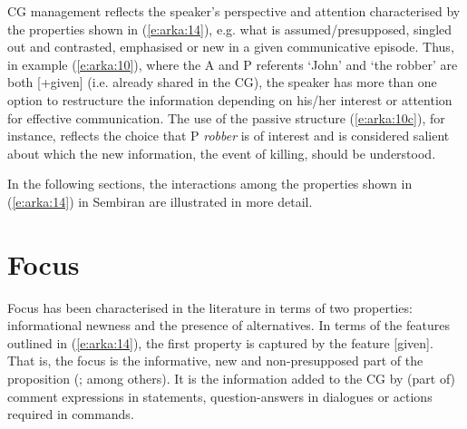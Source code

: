 \documentclass[output=paper
,modfonts
,nonflat]{langsci/langscibook}
\begin{document}
CG management reflects the speaker’s perspective and attention characterised by the properties shown in (\ref{e:arka:14}), e.g. what is assumed/presupposed, singled out and contrasted, emphasised or new in a given communicative episode. Thus, in example (\ref{e:arka:10}), where the A and P referents ‘John’ and ‘the robber’ are both [+given] (i.e. already shared in the CG), the speaker has more than one option to restructure the information depending on his/her interest or attention for effective communication. The use of the passive structure (\ref{e:arka:10c}), for instance, reflects the choice that P \textit{robber} is of interest and is considered salient about which the new information, the event of killing, should be understood.

In the following sections, the interactions among the properties shown in (\ref{e:arka:14}) in Sembiran  are illustrated in more detail.

\section{\label{s:arka:4}Focus}

Focus has been characterised in the literature in terms of two properties: informational newness and the presence of alternatives. In terms of the features outlined in (\ref{e:arka:14}), the first property is captured by the feature [\textminus given]. That is, the focus is the informative, new and non-presupposed part of the proposition (\citealt{Lambrecht1994,Vallduví1996,Dalrymple2014}; among others). It is the information added to the CG by (part of) comment expressions in statements, question-answers in dialogues or actions required in commands. 
\end{document}
